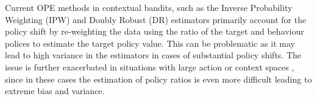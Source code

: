 Current OPE methods in contextual bandits, such as the Inverse Probability Weighting (IPW) \citep{horvitz1952generalization} and Doubly Robust (DR) \citep{dudik2014doubly} estimators primarily account for the policy shift by re-weighting the data using the ratio of the target and behaviour polices to estimate the target policy value. This can be problematic as it may lead to high variance in the estimators in cases of substantial policy shifts. The issue is further exacerbated in situations with large action or context spaces \citep{saito2022off}, since in these cases the estimation of policy ratios is even more difficult leading to extreme bias and variance.



